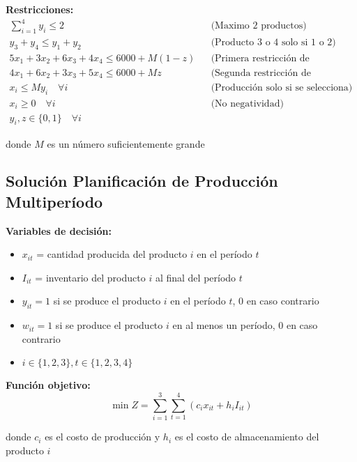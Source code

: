 \documentclass[12pt]{article}
\begin{document}
\textbf{Restricciones:}
\begin{align*}
    \sum_{i=1}^{4} y_i \leq 2 && \text{(Maximo 2 productos)} \\
    y_3 + y_4 \leq y_1 + y_2 && \text{(Producto 3 o 4 solo si 1 o 2)} \\
    5x_1 + 3x_2 + 6x_3 + 4x_4 \leq 6000 + M(1-z) && \text{(Primera restricción de capacidad)} \\
    4x_1 + 6x_2 + 3x_3 + 5x_4 \leq 6000 + Mz && \text{(Segunda restricción de capacidad)} \\
    x_i \leq My_i \quad \forall i && \text{(Producción solo si se selecciona)} \\
    x_i \geq 0 \quad \forall i && \text{(No negatividad)} \\
    y_i, z \in \{0,1\} \quad \forall i
\end{align*}
\begin{center}
donde $M$ es un número suficientemente grande
\end{center}

\subsection{Solución Planificación de Producción Multiperíodo}

\textbf{Variables de decisión:}
\begin{itemize}
    \item $x_{it}$ = cantidad producida del producto $i$ en el período $t$
    \item $I_{it}$ = inventario del producto $i$ al final del período $t$
    \item $y_{it} = 1$ si se produce el producto $i$ en el período $t$, 0 en caso contrario
    \item $w_{it} = 1$ si se produce el producto $i$ en al menos un período, 0 en caso contrario
    \item $i \in \{1, 2, 3\}, t \in \{1, 2, 3, 4\}$
\end{itemize}

\textbf{Función objetivo:}
$$\min Z = \sum_{i=1}^{3} \sum_{t=1}^{4} (c_i x_{it} + h_i I_{it})$$
\begin{center}
donde $c_i$ es el costo de producción y $h_i$ es el costo de almacenamiento del producto $i$
\end{center}
\end{document}
